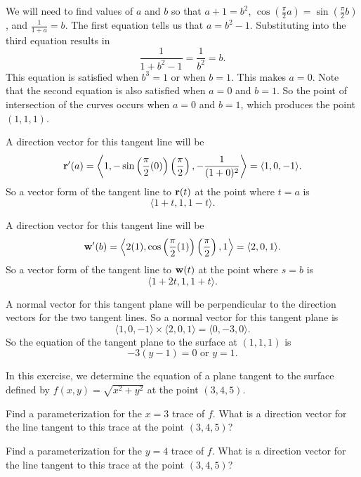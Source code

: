 \begin{exercises}
\begin{exerciseSolution}
\ba

	\item We will need to find values of $a$ and $b$ so that $a+1=b^2$, $\cos\left(\frac{\pi}{2} a\right) = \sin\left(\frac{\pi}{2}b\right)$, and $\frac{1}{1+a} = b$. The first equation tells us that $a = b^2-1$. Substituting into the third equation results in 
\[\frac{1}{1+b^2-1} = \frac{1}{b^2} = b.\]
This equation is satisfied when $b^3=1$ or when $b=1$. This makes $a=0$. Note that the second equation is also satisfied when $a=0$ and $b=1$. So the point of intersection of the curves occurs when $a=0$ and $b=1$, which produces the point $(1, 1,1)$. 
	
	\item A direction vector for this tangent line will be 
\[\mathbf{r}'(a) = \left\langle 1, -\sin\left(\frac{\pi}{2} (0)\right)\left(\frac{\pi}{2}\right), -\frac{1}{(1+0)^2} \right\rangle = \langle 1,0,-1\rangle.\]
So a vector form of the tangent line to $\mathbf{r}(t)$ at the point where $t = a$ is
\[\langle 1 + t, 1, 1-t \rangle.\]
	
	\item A direction vector for this tangent line will be 
\[\mathbf{w}'(b) = \left\langle 2(1), \cos\left(\frac{\pi}{2} (1)\right)\left(\frac{\pi}{2}\right), 1 \right\rangle = \langle 2,0,1\rangle.\]
So a vector form of the tangent line to $\mathbf{w}(t)$ at the point where $s = b$ is
\[\langle 1 + 2t, 1, 1+t \rangle.\]
	
	\item A normal vector for this tangent plane will be perpendicular to the direction vectors for the two tangent lines. So a normal vector for this tangent plane is 
\[\langle 1, 0, -1 \rangle \times \langle 2, 0, 1 \rangle = \langle 0, -3, 0 \rangle.\]
So the equation of the tangent plane to the surface at $(1,1,1)$ is 
\[-3(y-1) = 0 \text{ or } y=1.\]
\ea
\end{exerciseSolution}



\item \label{Ez:9.7.3}   In this exercise, we determine the equation of a plane tangent to the surface defined by $f(x,y) = \sqrt{x^2+y^2}$ at the point $(3,4,5)$.
    \ba
    \item Find a parameterization for the $x=3$ trace of $f$. What is a direction vector for the line tangent to this trace at the point $(3,4,5)$?

    \item  Find a parameterization for the $y=4$ trace of $f$. What is a direction vector for the line tangent to this trace at the point $(3,4,5)$?


\end{exercises}
